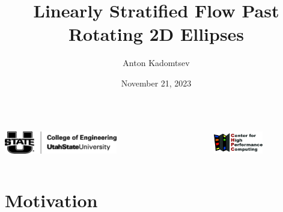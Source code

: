 \documentclass[aspectratio=169,xcolor=dvipsnames]{beamer}
\title[short title]{Linearly Stratified Flow Past Rotating 2D Ellipses}
\author[Anton] {Anton Kadomtsev}
\institute[USU] %
{
    Department of Mechanical and Aerospace Engineering
    \vskip 3pt
}
\date{November 21, 2023} %
\begin{document}
\begin{frame}
    \titlepage
    \begin{columns}[c]
            \includegraphics[height=1.0cm]{figures/u-state-black.png}
        
        \begin{figure}
        \end{figure}

        \begin{figure}
            \centering
            \includegraphics[height=1.0cm]{figures/Utah_CHPC_logo.jpg}
        \end{figure} 
        
    \end{columns}     
    
\end{frame}


\section{Motivation}
\end{document}
